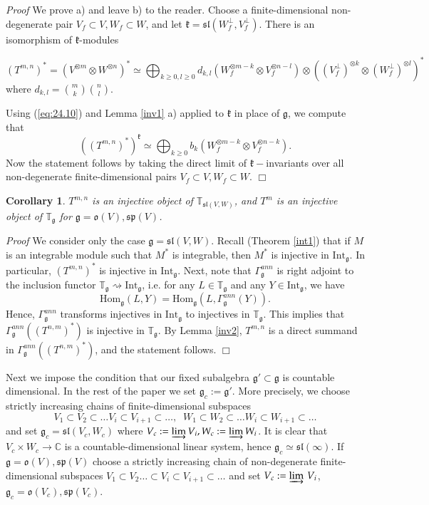 \documentclass[10pt]{amsart}
\newcounter{theorem}
\newtheorem{corollary}[theo]{Corollary}
\renewenvironment{proof}{ \emph{Proof}}{$\Box$}
\newcommand {\CC} {\mathbb {C}}
\newcommand{\TT}{\mathbb{T}}
\renewcommand{\sp}{\mathfrak{sp}}
\renewcommand{\sl}{\mathfrak{sl}}
\newcommand{\kk}{\mathfrak{k}}
\newcommand{\oo}{\mathfrak{o}}
\renewcommand{\gg}{\mathfrak{g}}
\newcommand{\Int}{\mathrm{Int}}
\newcommand{\Hom}{\mathrm{Hom}}
\begin{document}
\begin{proof} We prove a) and leave b) to the reader.
Choose a finite-dimensional non-degenerate pair $V_f \subset V, W_f \subset W$, and let $\kk=\sl(W_f^\perp,V_f^\perp)$. There is an isomorphism of $\kk$-modules 

\begin{equation}\label{eq:24.10}
 (T^{m,n})^*=(V^{\otimes m}\otimes W^{\otimes n})^*\simeq \bigoplus_{k\geq0,l\geq0}d_{k,l}(W_f^{\otimes m-k}\otimes V_f^{\otimes n-l})\otimes ((V_f^\perp)^{\otimes k}\otimes (W_f^\perp)^{\otimes l})^*
\end{equation}
where $d_{k,l}=\binom{m}{k}\binom{n}{l}$.

Using (\ref{eq:24.10}) and Lemma \ref{inv1} a) applied to $\kk$ in place of $\gg$, we compute that
$$\left((T^{m,n})^*\right)^\kk\simeq  \bigoplus_{k\geq0}b_{k}(W_f^{\otimes m-k}\otimes V_f^{\otimes n-k}).$$
Now the statement follows by taking the direct limit of $\kk-$invariants over all non-degenerate finite-dimensional pairs $V_f\subset V, W_f\subset W$.
\end{proof}

\begin{corollary}\label{injective} $T^{m,n}$ is an injective object of $\TT_{\sl(V,W)}$, and $T^m$ is an injective object of $\TT_\gg$ for $\gg = \oo(V),\sp(V)$.
\end{corollary}

\begin{proof} We consider only the case $\gg = \sl(V,W)$. Recall (Theorem \ref{int1}) that if $M$ is an integrable module such that $M^*$ is integrable, then $M^*$ is injective in $\Int_\gg$. In particular,  $(T^{m,n})^*$ is injective in $\Int_\gg$. Next, note that $\Gamma_\gg^{ann}$ is right adjoint to the inclusion functor $\TT_\gg \rightsquigarrow \Int_\gg$, i.e. for any $L\in\TT_\gg$ and any $Y \in \Int_\gg$, we have $$\Hom_{\gg} (L,Y)=\Hom_{\gg} (L,\Gamma_\gg^{ann}(Y)).$$ Hence, $\Gamma_\gg^{ann}$ transforms injectives in $\Int_\gg$ to injectives in $\TT_\gg$. This implies that $\Gamma_\gg^{ann}((T^{n,m})^*)$ is injective  in $\TT_\gg$. By Lemma \ref{inv2},  $T^{m,n}$ is a direct summand in $\Gamma_\gg^{ann}((T^{n,m})^*)$, and the statement follows.
\end{proof}

Next we impose the condition that our fixed subalgebra $\gg' \subset
\gg$ is countable dimensional. In the rest of the paper we set $\gg_c
:= \gg'$. More precisely, we choose strictly increasing chains of
finite-dimensional subspaces
$$V_1\subset V_2\subset\dots V_i \subset V_{i+1} \subset \dots,
\;\;W_1\subset W_2\subset\dots W_i \subset W_{i+1} \subset \dots$$ and
set $\gg_c = \sl(V_c,W_c)$ where $V_c := \varinjlim V_i, W_c :=\varinjlim W_i$. 
It is clear that 
$V_c \times W_c \rightarrow \CC$ is a countable-dimensional linear
system, hence $\gg_c \simeq \sl(\infty)$. 
If $\gg = \oo(V),\sp(V)$ choose a strictly increasing chain of
non-degenerate finite-dimensional subspaces 
$V_1 \subset V_2 \dots \subset V_i\subset V_{i+1} \subset \dots $ and
set 
$V_c:= \varinjlim \, V_i$, $\gg_c = \oo(V_c), \sp(V_c)$. 
\end{document}
